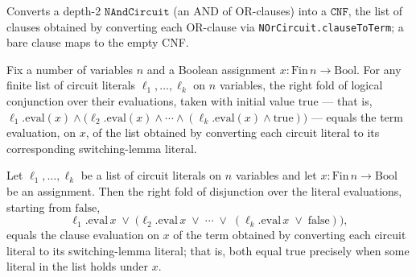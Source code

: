 \begin{definition}
\label{BoolCircuit.NAndCircuit.toCNF}
\leanok
{}
Converts a depth-2 $\texttt{NAndCircuit}$ (an AND of OR-clauses) into a $\texttt{CNF}$, the
list of clauses obtained by converting each OR-clause via \texttt{NOrCircuit.clauseToTerm};
a bare clause maps to the empty CNF.
\end{definition}

\begin{theorem}
\label{BoolCircuit.foldr_and_lits_eq_term_eval}
\leanok
{}
Fix a number of variables $n$ and a Boolean assignment $x : \mathrm{Fin}\,n \to
\mathrm{Bool}$. For any finite list of circuit literals $\ell_1, \ldots, \ell_k$ on $n$
variables, the right fold of logical conjunction over their evaluations, taken with
initial value $\mathrm{true}$ — that is, $\ell_1.\mathrm{eval}(x) \wedge
\bigl(\ell_2.\mathrm{eval}(x) \wedge \cdots \wedge (\ell_k.\mathrm{eval}(x) \wedge
\mathrm{true})\bigr)$ — equals the term evaluation, on $x$, of the list obtained by
converting each circuit literal to its corresponding switching-lemma literal.
\end{theorem}

\begin{theorem}
\label{BoolCircuit.foldr_or_lits_eq_clause_eval}
\leanok
{}
Let $\ell_1, \dots, \ell_k$ be a list of circuit literals on $n$ variables and let $x :
\mathrm{Fin}\,n \to \mathrm{Bool}$ be an assignment. Then the right fold of disjunction
over the literal evaluations, starting from $\mathrm{false}$,
\[
\ell_1.\mathrm{eval}\,x \;\lor\; \bigl(\ell_2.\mathrm{eval}\,x \;\lor\; \cdots \;\lor\;
(\ell_k.\mathrm{eval}\,x \;\lor\; \mathrm{false})\bigr),
\]
equals the clause evaluation on $x$ of the term obtained by converting each circuit
literal to its switching-lemma literal; that is, both equal $\mathrm{true}$ precisely
when some literal in the list holds under $x$.
\end{theorem}

